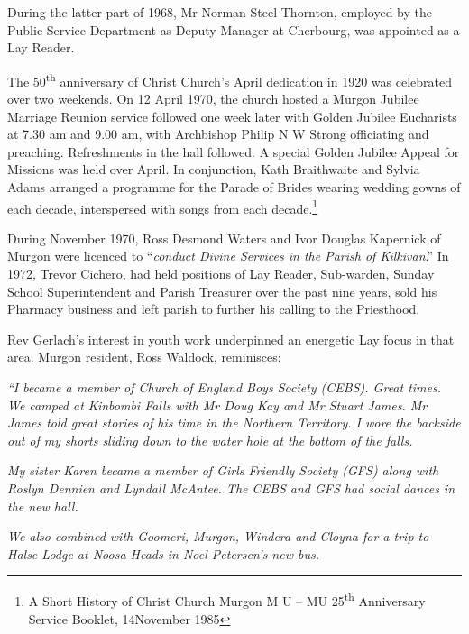 During the latter part of 1968, Mr Norman Steel Thornton, employed by the Public Service Department as Deputy Manager at Cherbourg, was appointed as a Lay Reader.



The 50\textsuperscript{th} anniversary of Christ Church's April dedication in 1920 was celebrated over two weekends. On 12 April 1970, the church hosted a Murgon Jubilee Marriage Reunion service followed one week later with Golden Jubilee Eucharists at 7.30 am and 9.00 am, with Archbishop Philip N W Strong officiating and preaching. Refreshments in the hall followed. A special Golden Jubilee Appeal for Missions was held over April. In conjunction, Kath Braithwaite and Sylvia Adams arranged a programme for the Parade of Brides wearing wedding gowns of each decade, interspersed with songs from each decade.\footnote{A Short History of Christ Church Murgon M U -- MU 25\textsuperscript{th} Anniversary Service Booklet, 14November 1985}


During November 1970, Ross Desmond Waters and Ivor Douglas Kapernick of Murgon were licenced to ``\emph{conduct Divine Services in the Parish of Kilkivan}.'' In 1972, Trevor Cichero, had held positions of Lay Reader, Sub-warden, Sunday School Superintendent and Parish Treasurer over the past nine years, sold his Pharmacy business and left parish to further his calling to the Priesthood.



Rev Gerlach's interest in youth work underpinned an energetic Lay focus in that area. Murgon resident, Ross Waldock, reminisces:



\emph{``I became a member of Church of England Boys Society (CEBS). Great times. We camped at Kinbombi Falls with Mr Doug Kay and Mr Stuart James. Mr James told great stories of his time in the Northern Territory. I wore the backside out of my shorts sliding down to the water hole at the bottom of the falls.}



\smallskip


\emph{My sister Karen became a member of Girls Friendly Society (GFS) along with Roslyn Dennien and Lyndall McAntee. The CEBS and GFS had social dances in the new hall.}



\emph{We also combined with Goomeri, Murgon, Windera and Cloyna for a trip to Halse Lodge at Noosa Heads in Noel Petersen's new bus.}



